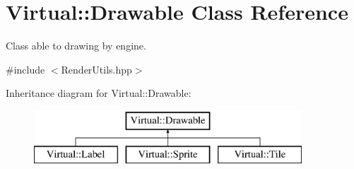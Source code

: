 \hypertarget{class_virtual_1_1_drawable}{}\section{Virtual\+:\+:Drawable Class Reference}
\label{class_virtual_1_1_drawable}


Class able to drawing by engine.  




{\ttfamily \#include $<$Render\+Utils.\+hpp$>$}

Inheritance diagram for Virtual\+:\+:Drawable\+:\begin{figure}[H]
\begin{center}
\leavevmode
\includegraphics[height=2.000000cm]{class_virtual_1_1_drawable}
\end{center}
\end{figure}
